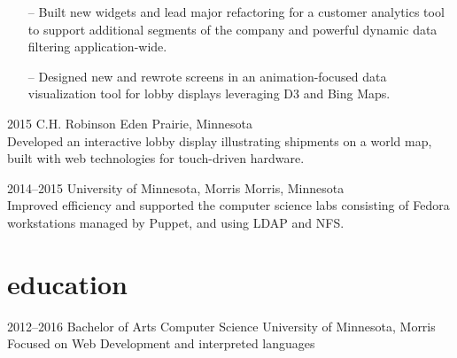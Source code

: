 \documentclass[]{cv-style} %
\begin{document}
\begin{entrylist}
{
\begin{itemize}
    \item[--] Built new widgets and lead major refactoring for a customer analytics tool to support additional segments of the company and powerful dynamic data filtering application-wide.
    \item[--] Designed new and rewrote screens in an animation-focused data visualization tool for lobby displays leveraging D3 and Bing Maps.
\end{itemize}}


\entry
{2015}
{C.H. Robinson}
{Eden Prairie, Minnesota}
{ \\
Developed an interactive lobby display illustrating shipments on a world map, built with web technologies for touch-driven hardware.}


\entry
{2014--2015}
{University of Minnesota, Morris}
{Morris, Minnesota}
{ \\
Improved efficiency and supported the computer science labs consisting of Fedora workstations managed by Puppet, and using LDAP and NFS.}


\end{entrylist}


\section{education}

\begin{entrylist}


\entry
{2012--2016}
{Bachelor of Arts {\normalfont Computer Science}}
{University of Minnesota, Morris}
{\small{Focused on Web Development and interpreted languages}}


\end{entrylist}
\end{document}
